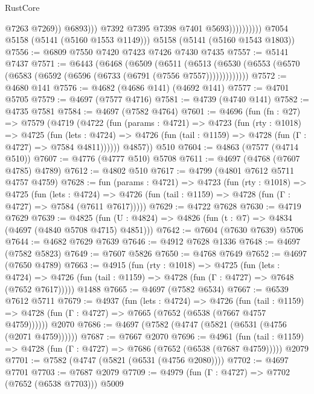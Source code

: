 \begin{lexlean}{RustCore}
\begin{coremodule}
                                    @7263
                                    @7269))
                                @6893)))
                          @7392
                          @7395
                          @7398
                          @7401
                          @5693))))))))))
      @7054
      @5158
      (@5141 (@5160 @1553 @1149)))
    @5158
    (@5141 (@5160 @1543 @1803))
@7556 := @6809 @7550 @7420 @7423 @7426 @7430 @7435
@7557 := @5141 @7437
@7571 := @6443
    (@6468
      (@6509
        (@6511
          (@6513 (@6530 (@6553 (@6570 (@6583 (@6592 (@6596 (@6733 (@6791 (@7556 @7557)))))))))))))
@7572 := @4680 @141
@7576 := @4682 (@4686 @141) (@4692 @141)
@7577 := @4701 @5705
@7579 := @4697 (@7577 @4716)
@7581 := @4739 (@4740 @141)
@7582 := @4735 @7581
@7584 := @4697 (@7582 @4764)
@7601 := @4696
    (fun (fn : @27) =>
    @7579
      (@4719
        (@4722
          (fun (params : @4721) =>
          @4723
            (fun (rty : @1018) =>
            @4725
              (fun (lets : @4724) =>
              @4726 (fun (tail : @1159) => @4728 (fun (Γ : @4727) => @7584 @4811))))))
        @4857))
    @510
@7604 := @4863 (@7577 (@4714 @510))
@7607 := @4776 (@4777 @510) @5708
@7611 := @4697 (@4768 (@7607 @4785) @4789)
@7612 := @4802 @510
@7617 := @4799 (@4801 @7612 @5711 @4757 @4759)
@7628 := fun (params : @4721) =>
  @4723
    (fun (rty : @1018) =>
    @4725
      (fun (lets : @4724) =>
      @4726 (fun (tail : @1159) => @4728 (fun (Γ : @4727) => @7584 (@7611 @7617)))))
@7629 := @4722 @7628
@7630 := @4719 @7629
@7639 := @4825 (fun (U : @4824) => @4826 (fun (t : @7) => @4834 (@4697 (@4840 @5708 @4715) @4851)))
@7642 := @7604 (@7630 @7639) @5706
@7644 := @4682 @7629 @7639
@7646 := @4912 @7628 @1336
@7648 := @4697 (@7582 @5823)
@7649 := @7607 @5826
@7650 := @4768 @7649
@7652 := @4697 (@7650 @4789)
@7663 := @4915
    (fun (rty : @1018) =>
    @4725
      (fun (lets : @4724) =>
      @4726 (fun (tail : @1159) => @4728 (fun (Γ : @4727) => @7648 (@7652 @7617)))))
    @1488
@7665 := @4697 (@7582 @6534)
@7667 := @6539 @7612 @5711
@7679 := @4937
    (fun (lets : @4724) =>
    @4726
      (fun (tail : @1159) => @4728 (fun (Γ : @4727) => @7665 (@7652 (@6538 (@7667 @4757 @4759))))))
    @2070
@7686 := @4697 (@7582 (@4747 (@5821 (@6531 (@4756 (@2071 @4759))))))
@7687 := @7667 @2070
@7696 := @4961
    (fun (tail : @1159) => @4728 (fun (Γ : @4727) => @7686 (@7652 (@6538 (@7687 @4759)))))
    @2079
@7701 := @7582 (@4747 (@5821 (@6531 (@4756 @2080))))
@7702 := @4697 @7701
@7703 := @7687 @2079
@7709 := @4979 (fun (Γ : @4727) => @7702 (@7652 (@6538 @7703))) @5009

\end{coremodule}
\end{lexlean}
